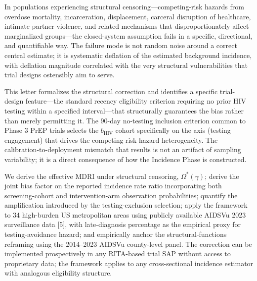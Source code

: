 \documentclass[12pt]{article}
\begin{document}
In populations experiencing structural censoring---competing-risk hazards from overdose mortality, incarceration, displacement, carceral disruption of healthcare, intimate partner violence, and related mechanisms that disproportionately affect marginalized groups---the closed-system assumption fails in a specific, directional, and quantifiable way. The failure mode is not random noise around a correct central estimate; it is systematic deflation of the estimated background incidence, with deflation magnitude correlated with the very structural vulnerabilities that trial designs ostensibly aim to serve.

This letter formalizes the structural correction and identifies a specific trial-design feature---the standard recency eligibility criterion requiring no prior HIV testing within a specified interval---that structurally guarantees the bias rather than merely permitting it. The 90-day no-testing inclusion criterion common to Phase 3 PrEP trials selects the $b_{\mathrm{HIV}}$ cohort specifically on the axis (testing engagement) that drives the competing-risk hazard heterogeneity. The calibration-to-deployment mismatch that results is not an artifact of sampling variability; it is a direct consequence of how the Incidence Phase is constructed.

We derive the effective MDRI under structural censoring, $\Omega^*(\gamma)$; derive the joint bias factor on the reported incidence rate ratio incorporating both screening-cohort and intervention-arm observation probabilities; quantify the amplification introduced by the testing-exclusion selection; apply the framework to 34 high-burden US metropolitan areas using publicly available AIDSVu 2023 surveillance data [5], with late-diagnosis percentage as the empirical proxy for testing-avoidance hazard; and empirically anchor the structural-functions reframing using the 2014--2023 AIDSVu county-level panel. The correction can be implemented prospectively in any RITA-based trial SAP without access to proprietary data; the framework applies to any cross-sectional incidence estimator with analogous eligibility structure.
\end{document}
